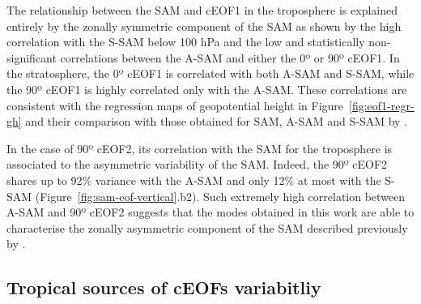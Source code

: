 \documentclass[pdflatex,sn-basic]{sn-jnl}
\theoremstyle{thmstyleone}%
\theoremstyle{thmstyletwo}%
\theoremstyle{thmstylethree}%
\begin{document}
The relationship between the SAM and cEOF1 in the troposphere is explained entirely by the zonally symmetric component of the SAM as shown by the high correlation with the S-SAM below 100 hPa and the low and statistically non-significant correlations between the A-SAM and either the 0º or 90º cEOF1.
In the stratosphere, the 0º cEOF1 is correlated with both A-SAM and S-SAM, while the 90º cEOF1 is highly correlated only with the A-SAM.
These correlations are consistent with the regression maps of geopotential height in Figure~\ref{fig:eof1-regr-gh} and their comparison with those obtained for SAM, A-SAM and S-SAM by \citet{campitelli2022}.

In the case of 90º cEOF2, its correlation with the SAM for the troposphere is associated to the asymmetric variability of the SAM.
Indeed, the 90º cEOF2 shares up to 92\% variance with the A-SAM and only 12\% at most with the S-SAM (Figure~\ref{fig:sam-eof-vertical}.b2).
Such extremely high correlation between A-SAM and 90º cEOF2 suggests that the modes obtained in this work are able to characterise the zonally asymmetric component of the SAM described previously by \citet{campitelli2022}.

\hypertarget{tropical}{%
\subsection{Tropical sources of cEOFs variabitliy}\label{tropical}}
\end{document}
